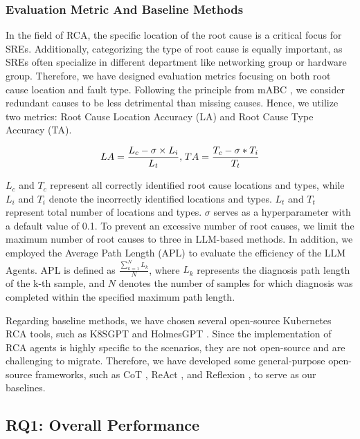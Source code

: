 \subsubsection{Evaluation Metric And Baseline Methods}

In the field of RCA, the specific location of the root cause is a critical focus for SREs. Additionally, categorizing the type of root cause is equally important, as SREs often specialize in different department like networking group or hardware group. Therefore, we have designed evaluation metrics focusing on both root cause location and fault type. Following the principle from mABC \citep{zhang2024mabc}, we consider redundant causes to be less detrimental than missing causes. Hence, we utilize two metrics: Root Cause Location Accuracy (LA) and Root Cause Type Accuracy (TA). 

\begin{equation}
{\fontsize{2}{3}\selectfont 
    LA = \frac{L_c - \sigma \times L_i}{L_t},\  TA = \frac{T_c - \sigma * T_i}{T_t}
}
\label{eq:einstein}
\end{equation}

$L_c$ and $T_c$ represent all correctly identified root cause locations and types, while $L_i$ and $T_i$ denote the incorrectly identified locations and types. $L_t$ and $T_t$ represent total number of locations and types. $\sigma$ serves as a hyperparameter with a default value of 0.1. To prevent an excessive number of root causes, we limit the maximum number of root causes to three in LLM-based methods. In addition, we employed the Average Path Length (APL) to evaluate the efficiency of the LLM Agents. APL is defined as $\frac{\sum^N_{k=1} L_k}{N}$, where $L_k$ represents the diagnosis path length of the k-th sample, and $N$ denotes the number of samples for which diagnosis was completed within the specified maximum path length.

Regarding baseline methods, we have chosen several open-source Kubernetes RCA tools, such as K8SGPT \citep{k8sgpt} and HolmesGPT \citep{holmesgpt}. Since the implementation of RCA agents is highly specific to the scenarios, they are not open-source and are challenging to migrate. Therefore, we have developed some general-purpose open-source frameworks, such as CoT \citep{wei2022chain}, ReAct \citep{yao2022react}, and Reflexion \citep{shinn2024reflexion}, to serve as our baselines.


\subsection{RQ1: Overall Performance}



